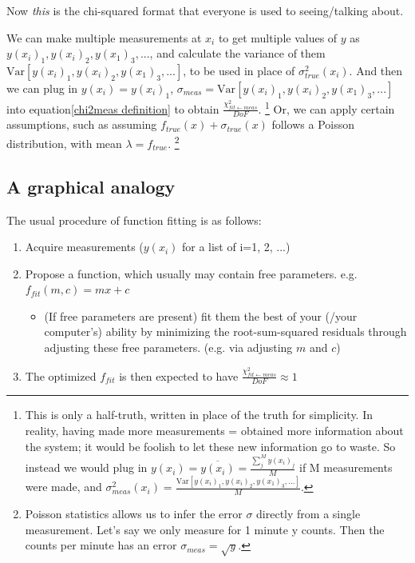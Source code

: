 \documentclass[a4paper, 12pt]{article}
\newcommand{\Var}[1]{\text{Var}[#1]}
\newcommand{\chifit}{\frac{\chi^2_{fit\leftarrow meas}}{DoF} }
\begin{document}
Now \textit{this} is the chi-squared format that everyone is used to seeing/talking about.

We can make multiple measurements at $x_i$ to get multiple values of $y$ as $y(x_i)_1, y(x_i)_2, y(x_1)_3, ...$, and calculate the variance of them $\Var{y(x_i)_1, y(x_i)_2, y(x_1)_3, ...}$, to be used in place of $\sigma_{true}^2(x_i)$. And then we can plug in $y(x_i) = y(x_i)_1$, $\sigma_{meas}=\Var{y(x_i)_1, y(x_i)_2, y(x_1)_3, ...}$ into equation\ref{chi2meas definition} to obtain $\chifit$.
\footnote{This is only a half-truth, written in place of the truth for simplicity. In reality, having made more measurements = obtained more information about the system; it would be foolish to let these new information go to waste. So instead we would plug in $y(x_i)=\overline{y(x_i)}=\frac{\sum\limits_j^M y(x_i)_j}{M}$ if M measurements were made, and $\sigma_{meas}^2(x_i)=\frac{\Var{y(x_i)_1, y(x_i)_2, y(x_1)_3, ...}}{M}$.}
Or, we can apply certain assumptions, such as assuming $f_{true}(x)+\sigma_{true}(x)$ follows a Poisson distribution, with mean $\lambda=f_{true}$.
\footnote{Poisson statistics allows us to infer the error $\sigma$ directly from a single measurement. Let's say we only measure for 1 minute y counts. Then the counts per minute has an error $\sigma_{meas}=\sqrt{y}$.}

\subsection{A graphical analogy}\label{Graphical proof}
The usual procedure of function fitting is as follows:
\begin{enumerate}
    \item Acquire measurements ($y(x_i)$ for a list of i=1, 2, ...)
    \item Propose a function, which usually may contain free parameters. e.g. $f_{fit}(m,c) =mx+c$ \label{propose function and fit}
    \begin{itemize}
        \item (If free parameters are present) fit them the best of your (/your computer's) ability by minimizing the root-sum-squared residuals through adjusting these free parameters. (e.g. via adjusting $m$ and $c$)
    \end{itemize}
    \item The optimized $f_{fit}$ is then expected to have $\chifit\approx 1$ \label{goodness of fit test point}
\end{enumerate}
\end{document}
